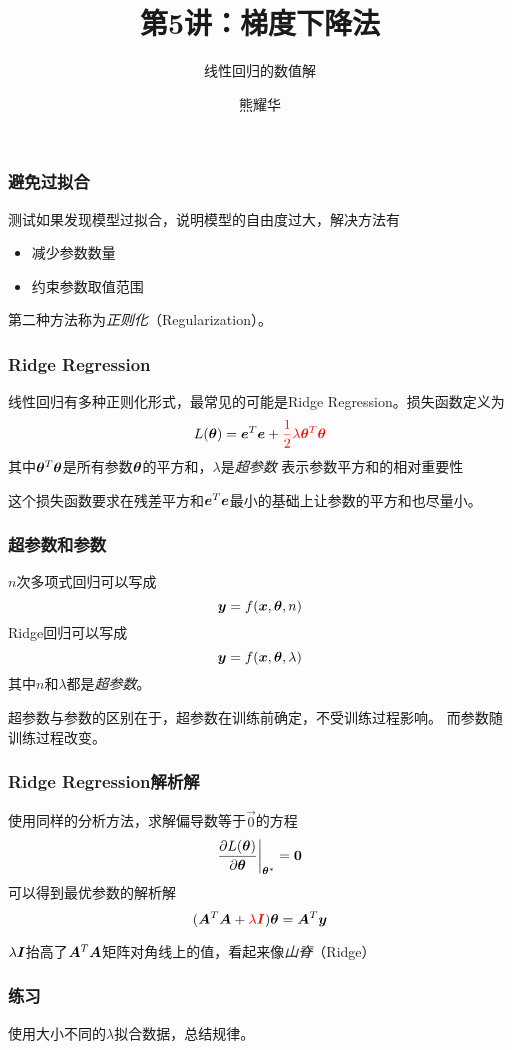 \documentclass[14pt]{beamer}
\title{第5讲：梯度下降法}
\subtitle{线性回归的数值解}
\author{熊耀华}
\institute{交通工程系}
\begin{document}
\begin{frame}
    \titlepage
\end{frame}

\begin{frame}
  \frametitle{避免过拟合}
  测试如果发现模型过拟合，说明模型的自由度过大，解决方法有
  \begin{itemize}
      \item 减少参数数量
      \item 约束参数取值范围
  \end{itemize}
  第二种方法称为\emph{正则化}（Regularization）。
\end{frame}

\begin{frame}
  \frametitle{Ridge Regression}
  线性回归有多种正则化形式，最常见的可能是Ridge Regression。损失函数定义为
  \begin{equation}
      L(\bm{\theta})=\bm{e}^T\bm{e}+{\color{red}\frac{1}{2}\lambda\bm{\theta}^T\bm{\theta}}
  \end{equation}
  其中$\bm{\theta}^T\bm{\theta}$是所有参数$\bm{\theta}$的平方和，$\lambda$是\emph{超参数}
  表示参数平方和的相对重要性

  这个损失函数要求在残差平方和$\bm{e}^T\bm{e}$最小的基础上让参数的平方和也尽量小。
\end{frame}

\begin{frame}
  \frametitle{超参数和参数}
  $n$次多项式回归可以写成
  \[\bm{y}=f(\bm{x},\bm{\theta},n)\]
  Ridge回归可以写成
  \[\bm{y}=f(\bm{x},\bm{\theta},\lambda)\]
  其中$n$和$\lambda$都是\emph{超参数}。
  
  超参数与参数的区别在于，超参数在训练前确定，不受训练过程影响。
  而参数随训练过程改变。
\end{frame}

\begin{frame}
  \frametitle{Ridge Regression解析解}
  使用同样的分析方法，求解偏导数等于$\vec{0}$的方程
  \begin{equation}
      \frac{\partial L(\bm{\theta})}{\partial\bm{\theta}}\bigg|_{\bm{\theta}^*}=\bm{0}
  \end{equation}
  可以得到最优参数的解析解
  \begin{equation}
      (\bm{A}^T\bm{A}+{\color{red}\lambda\bm{I}})\bm{\theta}=\bm{A}^T\bm{y}
  \end{equation}

  $\lambda\bm{I}$抬高了$\bm{A}^T\bm{A}$矩阵对角线上的值，看起来像\emph{山脊}（Ridge）
\end{frame}

\begin{frame}
  \frametitle{练习}
  使用大小不同的$\lambda$拟合数据，总结规律。
\end{frame}
\end{document}

